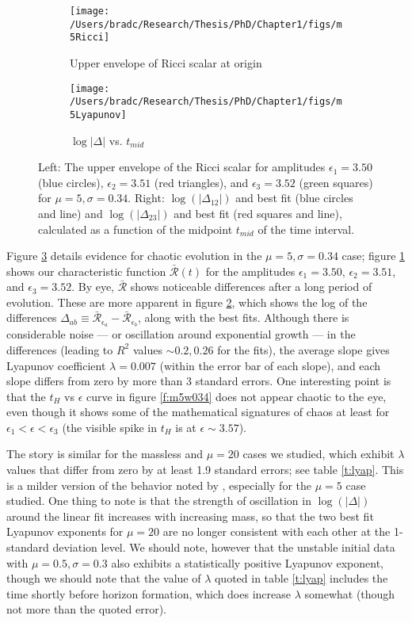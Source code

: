 \documentclass[../PhD.tex]{subfiles}
\begin{document}
\begin{figure}[!t]
\centering
\begin{subfigure}[t]{0.47\textwidth}
\texttt{[image: /Users/bradc/Research/Thesis/PhD/Chapter1/figs/m5Ricci]}
\caption{Upper envelope of Ricci scalar at origin}
\label{f:m5Ricci}
\end{subfigure}\hfill
\begin{subfigure}[t]{0.47\textwidth}
\texttt{[image: /Users/bradc/Research/Thesis/PhD/Chapter1/figs/m5Lyapunov]}
\caption{$\log | \Delta |$ vs. $t_{mid}$}
\label{f:m5Lyapunov}
\end{subfigure}
\caption[Evidence for chaotic evolution]{
Left: The upper envelope of the Ricci scalar for amplitudes
$\epsilon_1=3.50$ (blue circles), $\epsilon_2=3.51$ (red triangles), and
$\epsilon_3=3.52$ (green squares) for $\mu=5,\sigma=0.34$.
Right: $\log(|\Delta_{12}|)$ and best fit (blue
circles and line) and $\log(|\Delta_{23}|)$ and best fit (red squares and line),
calculated as a function of the midpoint $t_{mid}$ of the time interval.}
\label{f:m5chaotic}
\end{figure}

Figure \ref{f:m5chaotic} details evidence for chaotic evolution in the
$\mu=5,\sigma=0.34$ case; figure \ref{f:m5Ricci} shows our characteristic
function $\bar{\mathcal{R}}(t)$ for the amplitudes $\epsilon_1 = 3.50$,
$\epsilon_2 = 3.51$, and $\epsilon_3 = 3.52$. By eye, $\bar{\mathcal{R}}$ shows
noticeable differences after a long period of evolution. These are more
apparent in figure \ref{f:m5Lyapunov}, which shows the log of the differences
$\Delta_{ab}\equiv\bar{\mathcal{R}}_{\epsilon_a}-\bar{\mathcal R}_{\epsilon_b}$,
along with the best fits. Although there is considerable noise --- or
oscillation around exponential growth --- in the
differences (leading to $R^2$ values $\sim 0.2,0.26$ for the fits), the
average slope gives Lyapunov coefficient $\lambda=0.007$ (within the error
bar of each slope), and each slope differs from zero by more than 3 standard
errors. One interesting point is that the $t_H$ vs $\epsilon$ curve
in figure \ref{f:m5w034} does not appear chaotic to the eye, even though it
shows some of the mathematical signatures of chaos at least for
$\epsilon_1<\epsilon<\epsilon_3$ (the visible spike in $t_H$ is at 
$\epsilon\sim 3.57$).

The story is similar for the massless and $\mu=20$ cases we
studied, which exhibit $\lambda$ values that
differ from zero by at least 1.9 standard errors; see table \ref{t:lyap}.
This is a milder version of the behavior noted by
\cite{1602.03535,1410.1869,1608.05402}, especially for the $\mu=5$ case
studied.  
One thing to note is that the strength of oscillation in
$\log(|\Delta|)$ around the linear fit increases with increasing
mass, so that the two best fit Lyapunov exponents for $\mu = 20$ are no
longer consistent with each other at the 1-standard deviation level.
We should note, however that the unstable initial data with 
$\mu=0.5,\sigma=0.3$ also exhibits a statistically positive Lyapunov
exponent, though we should note that the value of $\lambda$ quoted in table
\ref{t:lyap} includes the time shortly before horizon formation, which does
increase $\lambda$ somewhat (though not more than the quoted error).
\end{document}

